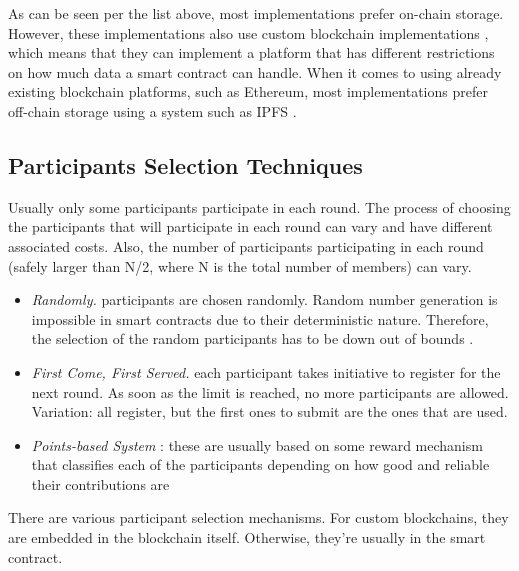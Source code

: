 As can be seen per the list above, most implementations prefer on-chain storage. However, these implementations also use custom blockchain implementations \cite{8733825, 9524833, 8894364, 9184854, 8893114}, which means that they can implement a platform that has different restrictions on how much data a smart contract can handle. When it comes to using already existing blockchain platforms, such as Ethereum, most implementations prefer off-chain storage using a system such as IPFS \cite{10.48550/arxiv.2007.03856, 8945913, Peyvandi2022, 9170559, 10.1145/3319535.3363256, 10.48550/arxiv.2011.07516}.

\subsection{Participants Selection Techniques}


Usually only some participants participate in each round. The process of choosing the participants that will participate in each round can vary and have different associated costs. Also, the number of participants participating in each round (safely larger than N/2, where N is the total number of members) can vary.

\begin{itemize}
    \item \textit{Randomly.} participants are chosen randomly. Random number generation is impossible in smart contracts due to their deterministic nature. Therefore, the selection of the random participants has to be down out of bounds \cite{9293091}.
    
    \item \textit{First Come, First Served.} each participant takes initiative to register for the next round. As soon as the limit is reached, no more participants are allowed. \cite{9184854}  Variation: all register, but the first ones to submit are the ones that are used. \cite{needed}
    
    \item \textit{Points-based System} : these are usually based on some reward mechanism that classifies each of the participants depending on how good and reliable their contributions are \cite{9293091, baffle, demo, 8905038, 8893114, Peyvandi2022}
\end{itemize}

There are various participant selection mechanisms. For custom blockchains, they are embedded in the blockchain itself. Otherwise, they're usually in the smart contract.

